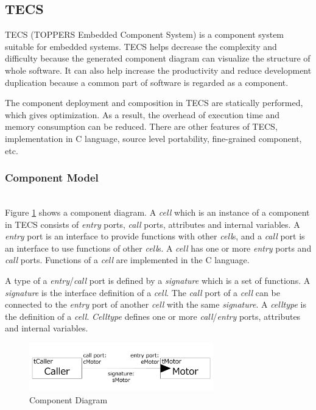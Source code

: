 \documentclass[conference,compsoc]{IEEEtran}
\begin{document}
\subsection{TECS}
\label{sec:TECS}
TECS (TOPPERS Embedded Component System) is a component system suitable for embedded systems.
TECS helps decrease the complexity and difficulty because the generated component diagram can visualize the structure of whole software.
It can also help increase the productivity and reduce development duplication  because a common part of software is regarded as a component.

The component deployment and composition in TECS are statically performed, which gives optimization.
As a result, the overhead of execution time and memory consumption can be reduced.
There are other features of TECS, implementation in C language, source level portability, fine-grained component, etc.

\subsubsection{Component Model}\mbox{}\\

Figure \ref{fig:component} shows a component diagram.
A {\it cell} which is an instance of a component in TECS consists of {\it entry} ports, {\it call} ports, attributes and internal variables.
A {\it entry} port is an interface to provide functions with other {\it cell}s, and a {\it call} port is an interface to use functions of other {\it cell}s.
A {\it cell} has one or more {\it entry} ports and {\it call} ports.
Functions of a {\it cell} are implemented in the C language.

A type of a {\it entry}/{\it call} port is defined by a {\it signature} which is a set of functions.
A {\it signature} is the interface definition of a {\it cell}.
The {\it call} port of a {\it cell} can be connected to the {\it entry} port of another {\it cell} with the same {\it signature}.
A {\it celltype} is the definition of a {\it cell}.
{\it Celltype} defines one or more {\it call}/{\it entry} ports, attributes and internal variables.

\begin{figure}[t]
    \centering
    \includegraphics[width=8cm,clip]{figure/component_diagram.pdf}
    \caption{Component Diagram}
    \label{fig:component}
\end{figure}
\end{document}
